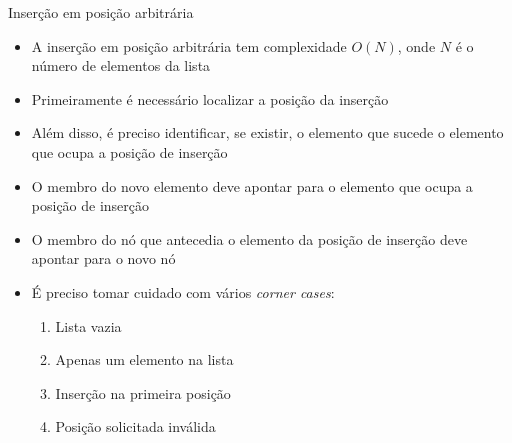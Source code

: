 \begin{frame}[fragile]{Inserção em posição arbitrária}

    \begin{itemize}
        \item A inserção em posição arbitrária tem complexidade $O(N)$, onde $N$ é o número
            de elementos da lista 

        \item Primeiramente é necessário localizar a posição da inserção

        \item Além disso, é preciso identificar, se existir, o elemento que sucede o elemento que
            ocupa a posição de inserção

        \item O membro  do novo elemento deve apontar para o elemento que
            ocupa a posição de inserção

        \item O membro  do nó que antecedia o elemento da posição de inserção
            deve apontar para o novo nó

        \item É preciso tomar cuidado com vários \textit{corner cases}:
            \begin{enumerate}
                \item Lista vazia
                \item Apenas um elemento na lista
                \item Inserção na primeira posição
                \item Posição solicitada inválida
            \end{enumerate}

    \end{itemize}

\end{frame}

